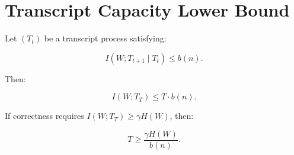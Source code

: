 \documentclass{article}
\begin{document}
\section*{Transcript Capacity Lower Bound}

Let $(T_t)$ be a transcript process satisfying:

\[
I(W;T_{t+1}\mid T_t) \le b(n).
\]

Then:

\[
I(W;T_T) \le T \cdot b(n).
\]

If correctness requires $I(W;T_T) \ge \gamma H(W)$, then:

\[
T \ge \frac{\gamma H(W)}{b(n)}.
\]
\end{document}
